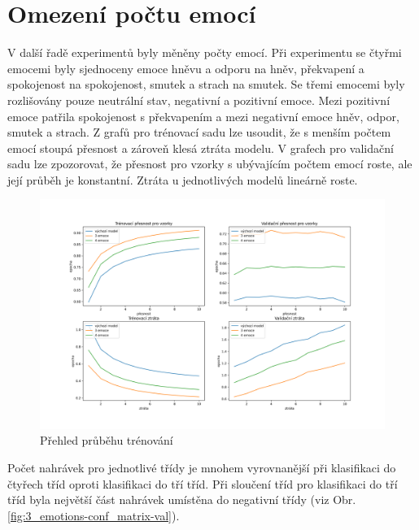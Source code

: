 \documentclass[FM,BP]{tulthesis}
\begin{document}
\section{Omezení počtu emocí} %
V další řadě experimentů byly měněny počty emocí. Při experimentu se čtyřmi emocemi byly sjednoceny emoce hněvu a odporu na hněv, překvapení a spokojenost na spokojenost, smutek a strach na smutek. Se třemi emocemi byly rozlišovány pouze neutrální stav, negativní a pozitivní emoce. Mezi pozitivní emoce patřila spokojenost s překvapením a mezi negativní emoce hněv, odpor, smutek a strach. Z grafů pro trénovací sadu lze usoudit, že s menším počtem emocí stoupá přesnost a zároveň klesá ztráta modelu. V grafech pro validační sadu lze zpozorovat, že přesnost pro vzorky s ubývajícím počtem emocí roste, ale její průběh je konstantní. Ztráta u jednotlivých modelů lineárně roste.

\begin{figure}[!htbp]
\centerline{\includegraphics[scale=.5]{training_course-emotion_reduction.png}}
\caption{Přehled průběhu trénování}
\label{fig}
\end{figure}
\FloatBarrier

Počet nahrávek pro jednotlivé třídy je mnohem vyrovnanější při klasifikaci do čtyřech tříd oproti klasifikaci do tří tříd. Při sloučení tříd pro klasifikaci do tří tříd byla největší část nahrávek umístěna do negativní třídy (viz Obr. \ref{fig:3_emotions-conf_matrix-val}). 
\end{document}

